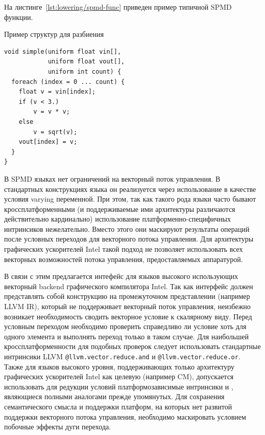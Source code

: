 На листинге~\cref{lst:lowering/spmd-func} приведен пример типичной SPMD функции.

\begin{ListingEnv}[!h]
    \captiondelim{ } 
    \caption{Пример структур для разбиения}\label{lst:lowering/spmd-func}
    \begin{lstlisting}[language={[ISO]C++}]
void simple(uniform float vin[],
            uniform float vout[],
            uniform int count) {
  foreach (index = 0 ... count) {
    float v = vin[index];
    if (v < 3.)
        v = v * v;
    else
        v = sqrt(v);
    vout[index] = v;
  }
}
    \end{lstlisting}
\end{ListingEnv}

В SPMD языках нет ограничений на векторный поток управления. В стандартных конструкциях языка он реализуется через использование в качестве условия varying переменной. При этом, так как такого рода языки часто бывают кроссплатформенными (и поддерживаемые ими архитектуры различаются действительно кардинально) использование платформенно-специфичных интринсиков нежелательно. Вместо этого они маскируют результаты операций после условных переходов для векторного потока управления. Для архитектуры графических ускорителей Intel такой подход не позволяет использовать всех векторных возможностей потока управления, предоставляемых аппаратурой.

В связи с этим предлагается интефейс для языков высокого использующих векторный backend графического компилятора Intel. Так как интерфейс должен представлять собой конструкцию на промежуточном представлении (например LLVM IR), который не поддерживает векторный поток управления, неизбежно возникает необходимость сводить векторное условие к скалярному виду. Перед условным переходом необходимо проверить справедливо ли условие хоть для одного элемента и выполнять переход только в таком случае. Для наибольшей кроссплатформенности для подобных проверок следует использовать стандартные интринсики LLVM \texttt{@llvm.vector.reduce.and} и \texttt{@llvm.vector.reduce.or}. Также для языков высокого уровня, поддерживающих только архитектуру графических ускорителей Intel как целевую (например CM), допускается использовать для редукции условий платформозависимые интринсики  и , являющиеся полными аналогами прежде упомянутых. Для сохранения семантического смысла и поддержки платформ, на которых нет развитой поддержки векторного потока управления, необходимо маскировать условием побочные эффекты дуги перехода.

